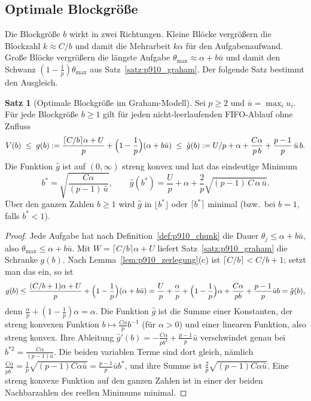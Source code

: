\documentclass[a4paper,12pt, twoside]{report}
\theoremstyle{definition}
\newtheorem{satz}{Satz}
\begin{document}
\subsection{Optimale Blockgröße}
\label{sec:p910_chunk}

Die Blockgröße $b$ wirkt in zwei Richtungen. Kleine Blöcke vergrößern die Blockzahl $k\approx C/b$ und damit die Mehrarbeit $k\alpha$ für den Aufgabenaufwand. Große Blöcke vergrößern die längste Aufgabe $\theta_{\max}\approx\alpha+b\bar u$ und damit den Schwanz $(1-\frac1p)\theta_{\max}$ aus Satz~\ref{satz:p910_graham}. Der folgende Satz bestimmt den Ausgleich.

\begin{satz}[Optimale Blockgröße im Graham-Modell]
\label{satz:p910_chunk}
Sei $p\ge 2$ und $\bar u=\max_iu_i$. Für jede Blockgröße $b\ge 1$ gilt für jeden nicht-leerlaufenden FIFO-Ablauf ohne Zufluss
\[
V(b)\;\le\;g(b):=\frac{\lceil C/b\rceil\alpha+U}{p}+\Bigl(1-\frac1p\Bigr)(\alpha+b\bar u)\;\le\;\hat g(b):=U/p+\alpha+\frac{C\alpha}{p\,b}+\frac{p-1}{p}\,\bar u\,b.
\]
Die Funktion $\hat g$ ist auf $(0,\infty)$ streng konvex und hat das eindeutige Minimum
\[
b^\ast=\sqrt{\frac{C\alpha}{(p-1)\,\bar u}},\qquad
\hat g(b^\ast)=\frac Up+\alpha+\frac2p\sqrt{(p-1)\,C\,\alpha\,\bar u}.
\]
Über den ganzen Zahlen $b\ge 1$ wird $\hat g$ in $\lfloor b^\ast\rfloor$ oder $\lceil b^\ast\rceil$ minimal (bzw.\ bei $b=1$, falls $b^\ast<1$).
\end{satz}

\begin{proof}
Jede Aufgabe hat nach Definition~\ref{def:p910_chunk} die Dauer $\theta_j\le\alpha+b\bar u$, also $\theta_{\max}\le\alpha+b\bar u$. Mit $W=\lceil C/b\rceil\alpha+U$ liefert Satz~\ref{satz:p910_graham} die Schranke $g(b)$. Nach Lemma~\ref{lem:p910_zerlegung}(c) ist $\lceil C/b\rceil<C/b+1$; setzt man das ein, so ist
\[
g(b)\le\frac{(C/b+1)\alpha+U}{p}+\Bigl(1-\frac1p\Bigr)(\alpha+b\bar u)=\frac Up+\frac{\alpha}{p}+\Bigl(1-\frac1p\Bigr)\alpha+\frac{C\alpha}{pb}+\frac{p-1}{p}\bar ub=\hat g(b),
\]
denn $\frac\alpha p+(1-\frac1p)\alpha=\alpha$. Die Funktion $\hat g$ ist die Summe einer Konstanten, der streng konvexen Funktion $b\mapsto\frac{C\alpha}{p}b^{-1}$ (für $\alpha>0$) und einer linearen Funktion, also streng konvex. Ihre Ableitung $\hat g'(b)=-\frac{C\alpha}{pb^2}+\frac{p-1}{p}\bar u$ verschwindet genau bei $b^{\ast2}=\frac{C\alpha}{(p-1)\bar u}$. Die beiden variablen Terme sind dort gleich, nämlich $\frac{C\alpha}{pb^\ast}=\frac1p\sqrt{(p-1)C\alpha\bar u}=\frac{p-1}{p}\bar ub^\ast$, und ihre Summe ist $\frac2p\sqrt{(p-1)C\alpha\bar u}$. Eine streng konvexe Funktion auf den ganzen Zahlen ist in einer der beiden Nachbarzahlen des reellen Minimums minimal.
\end{proof}
\end{document}
